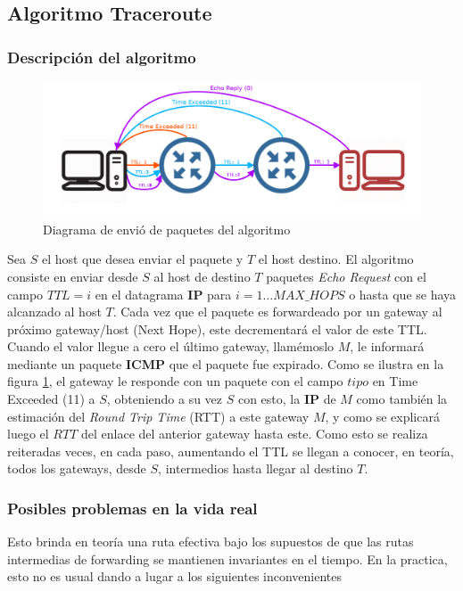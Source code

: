 \subsection{Algoritmo Traceroute}

\subsubsection{Descripción del algoritmo}

\begin{figure}[ht]
	\begin{center}
		\includegraphics[width=0.6\columnwidth]{imagenes/diagrama_1.jpg}
		\caption{Diagrama de envió de paquetes del algoritmo}
		\label{fig:diagramasimple}
	\end{center}
\end{figure}

Sea $S$ el host que desea enviar el paquete y $T$ el host destino.
El algoritmo consiste en enviar desde $S$ al host de destino $T$ paquetes
\emph{Echo Request} con el campo $TTL=i$ en el datagrama \textbf{IP} para $i=1 \dots
MAX\_HOPS$ o hasta que se haya alcanzado al host $T$. Cada vez que el paquete
es forwardeado por un gateway al próximo gateway/host (Next Hope), este decrementará el
valor de este TTL. Cuando el valor llegue a cero el último gateway, llamémoslo
$M$, le informará mediante un paquete \textbf{ICMP} que el paquete fue expirado.
Como se ilustra en la figura \ref{fig:diagramasimple}, el gateway le responde con un paquete con el campo $tipo$ en
Time Exceeded (11) a $S$, obteniendo a su vez $S$ con esto, la \textbf{IP} de $M$ como
también la estimación del \textit{Round
Trip Time} (RTT) a este gateway $M$, y como se explicará luego el $RTT$ del enlace
del anterior gateway hasta este. Como esto se realiza reiteradas veces, en
cada paso, aumentando el TTL se llegan a conocer, en teoría, todos los
gateways, desde $S$, intermedios hasta llegar al destino $T$.

\subsubsection{Posibles problemas en la vida real}


Esto brinda en teoría una ruta efectiva bajo los supuestos de que
las rutas intermedias de forwarding se mantienen invariantes en el tiempo. En
la practica, esto no es usual dando a lugar a los siguientes inconvenientes

